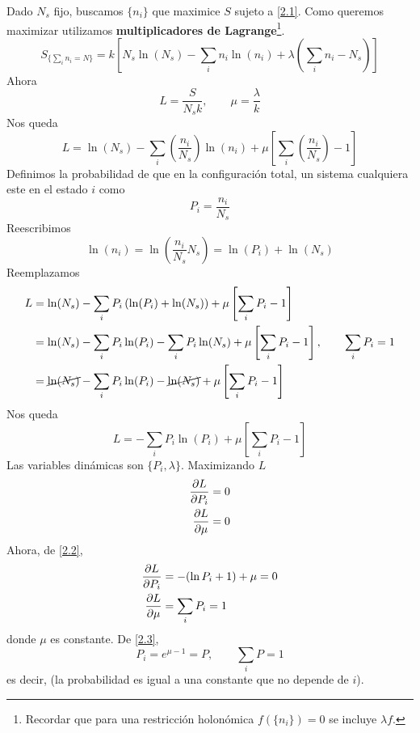 Dado $N_s$ fijo, buscamos $\{n_i\}$ que maximice $S$ sujeto a \eqref{2.1}. Como queremos maximizar utilizamos \textbf{multiplicadores de Lagrange}\footnote{Recordar que para una restricción holonómica $f(\{n_i\})=0$ se incluye $\lambda f$.}.
\begin{equation}
  S_{\{\sum_in_i=N\}}=k\left[N_s\ln(N_s)-\sum_in_i\ln(n_i)+\lambda \left(\sum_in_i-N_s\right)\right]
\end{equation}
Ahora
\begin{equation}
  L=\frac{S}{N_sk},\qquad \mu=\frac{\lambda}{k}
\end{equation}
Nos queda 
\begin{equation}
  L=\ln(N_s)-\sum_i\left(\frac{n_i}{N_s}\right)\ln(n_i)+\mu\left[\sum_i\left(\frac{n_i}{N_s}\right)-1\right]
\end{equation}
Definimos la probabilidad de que en la configuración total, un sistema cualquiera este en el estado $i$ como
\begin{equation}\label{sum Pi1}
  P_i=\frac{n_i}{N_s}
\end{equation}
Reescribimos
\begin{equation}
  \ln(n_i)=\ln\left(\frac{n_i}{N_s}N_s\right)=\ln(P_i)+\ln(N_s)
\end{equation}
Reemplazamos
\begin{align}
  L&=\ln(N_s)-\sum_i P_i\left(\ln(P_i)+\ln(N_s)\right)+\mu\left[\sum_i P_i-1\right]\\
  &=\ln(N_s)-\sum_iP_i\ln(P_i)-\sum_i P_i\ln(N_s)+\mu\left[\sum_i P_i-1\right],\qquad \sum_iP_i=1\\
  &=\cancel{\ln(N_s)}-\sum_iP_i\ln(P_i)-\cancel{\ln(N_s)}+\mu\left[\sum_iP_i-1\right]
\end{align}
Nos queda
\begin{equation}\label{2.2}
  L=-\sum_iP_i\ln(P_i)+\mu\left[\sum_i P_i-1\right]
\end{equation}
Las variables dinámicas son $\{P_i,\lambda\}$. Maximizando $L$
\begin{align}
  \pdv{L}{P_i}&=0\\
  \pdv{L}{\mu}&=0
\end{align}
Ahora, de \eqref{2.2},
\begin{align}
  \pdv{L}{P_i}&=-(\ln P_i+1)+\mu =0\label{2.3} \\
  \pdv{L}{\mu}&=\sum_i P_i=1
\end{align}
donde $\mu$ es constante. De \eqref{2.3},
\begin{equation}
  P_i=e^{\mu-1}=P,\qquad \sum_i P =1
\end{equation}
es decir,  (la probabilidad es igual a una constante que no depende de $i$).

